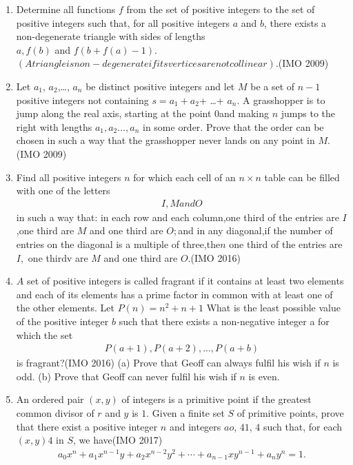 \begin{enumerate}
\item  Determine all functions $f$ from the set of positive integers to the set of positive integers such that, for all positive integers $a$ and $b$, there exists a non-degenerate triangle with sides of lengths \\$a, f (b)$ and $f (b+f(a)-1).$ \\
                $(A triangle is non-degenerate if its v    ertices are not collinear)$.\hfill(IMO 2009)
		\item Let $a_{1}$, $a_{2}$,\dots, $a_{n}$ be distinct positive integers and let $M$ be a set of $n-1$ positive integers not containing $s = a_{1}+a_{2}$+ \dots + $a_{n}$. A grasshopper is to jump along the real axis, starting at the point 0and making $n$ jumps to the right with lengths $a_{1}, a_{2}\dots,a_{n}$ in some order. Prove that the order can be chosen in such a way  that the grasshopper never lands on any point in $M$.\hfill(IMO 2009)
		\item Find all positive integers $n$ for which each cell of     an $n\times n$ table can be filled with one of the letters \begin{align}I,M and O\end{align} in such a way that:                                    in each row and each column,one third of the entries are $I$,one third are $M$ and one third are $O;$and in any diagonal,if the number of entries on the diagonal is a multiple of three,the$n$ one third of the entries are $I,$ one thirdv are $M$ and one third are $O.$\hfill (IMO 2016)
\item $A$ set of positive integers is called fragrant if it contains at least two elements and each of its elements has a prime factor in common with at least one of the other elements. Let $P(n) = n ^ 2 + n + 1$ What is the least possible value of the positive integer $b$ such that there exists a  non-negative integer a for which the set \begin{align}{P(a + 1), P(a + 2) ,...,P(a+b)}\end{align} is fragrant?\hfill (IMO 2016)
(a) Prove that Geoff can always fulfil his wish if $n$ is odd.                                       (b) Prove that Geoff can never fulfil his wish if $n$ is even.
\item An ordered pair $(x, y)$ of integers is a primitive point if the greatest common divisor of $r$ and $y$     is $1$. Given a finite set $S$ of primitive points, prove that there exist a positive integer $n$ and integers $ao$, $41$, $4$ such that, for each $(x, y)4$ in $S$, we have\hfill (IMO 2017)                           \begin{align}a_0x^n + a_1x^{n-1}y + a_2x^{n-2}y^2 + \cdots + a_{n-1}xy^{n-1} + a_ny^n = 1.\end{align}

\end{enumerate}
